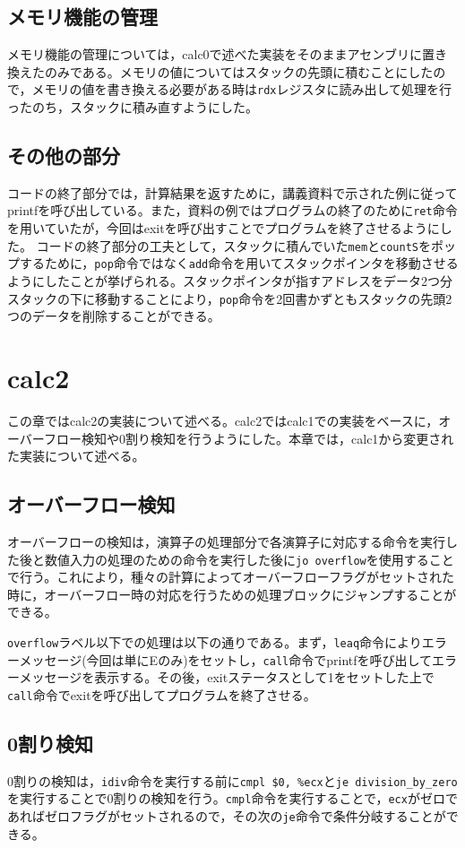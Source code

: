 \documentclass[a4paper]{jsarticle}
\newcommand{\var}[1]{\texttt{#1}}
\begin{document}
\subsection{メモリ機能の管理}
メモリ機能の管理については，calc0で述べた実装をそのままアセンブリに置き換えたのみである。メモリの値についてはスタックの先頭に積むことにしたので，メモリの値を書き換える必要がある時は\var{rdx}レジスタに読み出して処理を行ったのち，スタックに積み直すようにした。

\subsection{その他の部分}
コードの終了部分では，計算結果を返すために，講義資料で示された例に従ってprintfを呼び出している。また，資料の例ではプログラムの終了のために\var{ret}命令を用いていたが，今回はexitを呼び出すことでプログラムを終了させるようにした。
コードの終了部分の工夫として，スタックに積んでいた\var{mem}と\var{countS}をポップするために，\var{pop}命令ではなく\var{add}命令を用いてスタックポインタを移動させるようにしたことが挙げられる。スタックポインタが指すアドレスをデータ2つ分スタックの下に移動することにより，\var{pop}命令を2回書かずともスタックの先頭2つのデータを削除することができる。

\section{calc2}
この章ではcalc2の実装について述べる。calc2ではcalc1での実装をベースに，オーバーフロー検知や0割り検知を行うようにした。本章では，calc1から変更された実装について述べる。

\subsection{オーバーフロー検知}
オーバーフローの検知は，演算子の処理部分で各演算子に対応する命令を実行した後と数値入力の処理のための命令を実行した後に\var{jo overflow}を使用することで行う。これにより，種々の計算によってオーバーフローフラグがセットされた時に，オーバーフロー時の対応を行うための処理ブロックにジャンプすることができる。

\var{overflow}ラベル以下での処理は以下の通りである。まず，\var{leaq}命令によりエラーメッセージ(今回は単にEのみ)をセットし，\var{call}命令でprintfを呼び出してエラーメッセージを表示する。その後，exitステータスとして1をセットした上で\var{call}命令でexitを呼び出してプログラムを終了させる。

\subsection{0割り検知}
0割りの検知は，\var{idiv}命令を実行する前に\var{cmpl \$0, \%ecx}と\var{je division\_by\_zero}を実行することで0割りの検知を行う。\var{cmpl}命令を実行することで，\var{ecx}がゼロであればゼロフラグがセットされるので，その次の\var{je}命令で条件分岐することができる。
\end{document}
